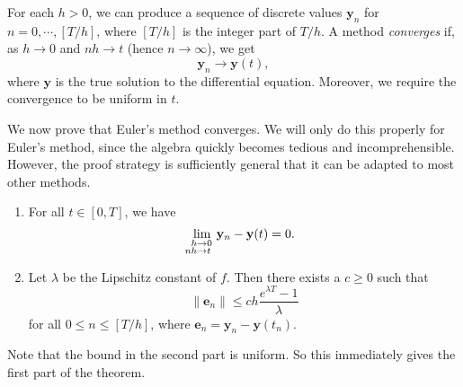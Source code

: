 \documentclass[a4paper]{article}
\begin{document}
\begin{defi}
  For each $h > 0$, we can produce a sequence of discrete values $\mathbf{y}_n$ for $n = 0, \cdots, [T/h]$, where $[T/h]$ is the integer part of $T/h$. A method \emph{converges} if, as $h \to 0$ and $nh \to t$ (hence $n \to \infty$), we get
  \[
    \mathbf{y}_n \to \mathbf{y}(t),
  \]
  where $\mathbf{y}$ is the true solution to the differential equation. Moreover, we require the convergence to be uniform in $t$.
\end{defi}

We now prove that Euler's method converges. We will only do this properly for Euler's method, since the algebra quickly becomes tedious and incomprehensible. However, the proof strategy is sufficiently general that it can be adapted to most other methods.

\begin{thm}\leavevmode
  \begin{enumerate}
    \item For all $t \in [0, T]$, we have
      \[
        \lim_{\substack{\mathllap{h} \to \mathrlap{0}\\\mathllap{nh}\to\mathrlap{t}}}\; \mathbf{y}_n - \mathbf{y}(t) = 0.
      \]
    \item Let $\lambda$ be the Lipschitz constant of $f$. Then there exists a $c \geq 0$ such that
      \[
        \|\mathbf{e}_n\| \leq ch \frac{e^{\lambda T} - 1}{\lambda}
      \]
      for all $0 \leq n \leq [T/h]$, where $\mathbf{e}_n = \mathbf{y}_n - \mathbf{y}(t_n)$.
  \end{enumerate}
\end{thm}
Note that the bound in the second part is uniform. So this immediately gives the first part of the theorem.
\end{document}

